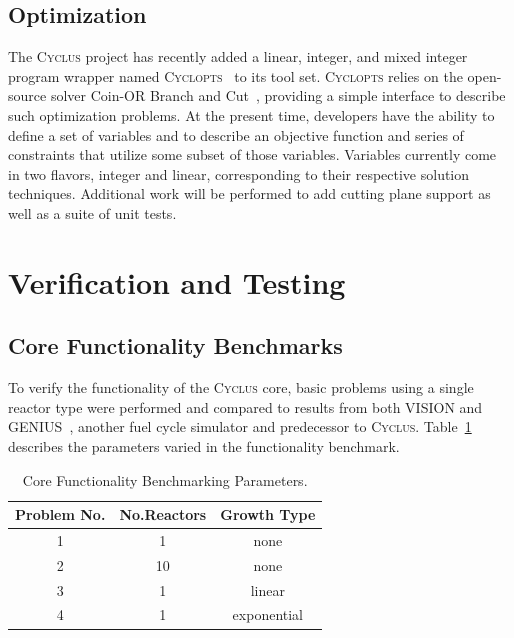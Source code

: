 \documentclass{anstrans}
\begin{document}
\subsection{Optimization}
The \textsc{Cyclus} project has recently added a linear, integer, and
mixed integer program wrapper named \textsc{Cyclopts}~\cite{cyclopts2012} to
its tool set. \textsc{Cyclopts} relies on the open-source solver Coin-OR Branch
and Cut~\cite{coinCBC}, providing a simple interface to describe such
optimization problems. At the present time, developers have the
ability to define a set of variables and to describe an objective
function and series of constraints that utilize some subset of those
variables. Variables currently come in two flavors, integer and
linear, corresponding to their respective solution
techniques. Additional work will be performed to add cutting plane
support as well as a suite of unit tests.

\section{Verification and Testing}

\subsection{Core Functionality Benchmarks}
To verify the functionality of the \textsc{Cyclus} core, basic problems using a 
single reactor type were performed and compared to results from both VISION and 
GENIUS~\cite{juchau2008}, another fuel cycle simulator and predecessor to 
\textsc{Cyclus}. Table~\ref{tab:scenarioparams} describes the parameters varied 
in the functionality benchmark.
\begin{table} [h]
\centering
\begin{tabular} {|c|c|c|} 
\hline
Problem No. & No.Reactors & Growth Type \\
\hline
1           & 1          & none        \\
2           & 10         & none        \\
3           & 1          & linear      \\
4           & 1          & exponential \\
\hline
\end{tabular}
  \caption{Core Functionality Benchmarking Parameters.}
  \label{tab:scenarioparams}
\end{table}
\end{document}
